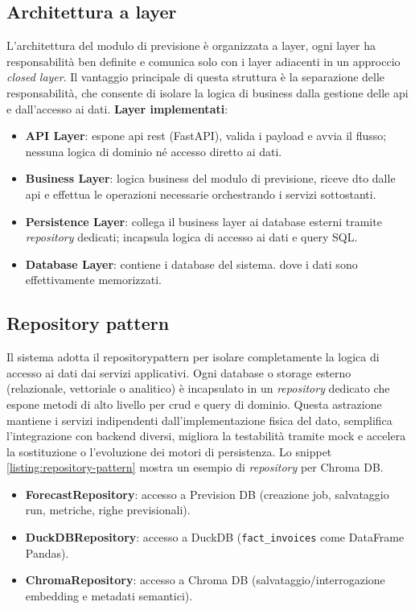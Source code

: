 \subsection{Architettura a layer}
L’architettura del modulo di previsione è organizzata a layer, ogni layer ha responsabilità ben definite e comunica solo con i layer adiacenti in un approccio \emph{closed layer}.
Il vantaggio principale di questa struttura è la separazione delle responsabilità, che consente di isolare la logica di business dalla gestione delle \acrshort{api} e dall’accesso ai dati.
\textbf{Layer implementati}:
\begin{itemize}
    \item \textbf{API Layer}: espone \acrshort{api} \acrshort{rest} (FastAPI), valida i payload e avvia il flusso; nessuna logica di dominio né accesso diretto ai dati.
    \item \textbf{Business Layer}: logica business del modulo di previsione, riceve \gls{dto} dalle \gls{api} e effettua le operazioni necessarie orchestrando i servizi sottostanti.
    \item \textbf{Persistence Layer}: collega il business layer ai database esterni tramite \textit{repository} dedicati; incapsula logica di accesso ai dati e query SQL.
    \item \textbf{Database Layer}: contiene i database del sistema. dove i dati sono effettivamente memorizzati.
\end{itemize}

\subsection{Repository pattern}
Il sistema adotta il \gls{repositorypattern} per isolare completamente la logica di accesso ai dati dai servizi applicativi. Ogni database o storage esterno (relazionale, vettoriale o analitico) è incapsulato in un \textit{repository} dedicato che espone metodi di alto livello per \acrshort{crud} e query di dominio. Questa astrazione mantiene i servizi indipendenti dall’implementazione fisica del dato, semplifica l’integrazione con backend diversi, migliora la testabilità tramite mock e accelera la sostituzione o l’evoluzione dei motori di persistenza.
Lo snippet \ref{listing:repository-pattern} mostra un esempio di \textit{repository} per Chroma DB.
\begin{itemize}
    \item \textbf{ForecastRepository}: accesso a Prevision DB (creazione job, salvataggio run, metriche, righe previsionali).
    \item \textbf{DuckDBRepository}: accesso a DuckDB (\texttt{fact\_invoices} come DataFrame Pandas).
    \item \textbf{ChromaRepository}: accesso a Chroma DB (salvataggio/interrogazione embedding e metadati semantici).
\end{itemize}

